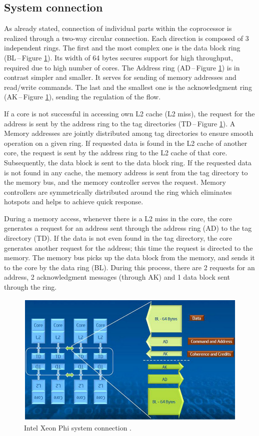 \subsection{System connection}
As already stated, connection of individual parts within the coprocessor is realized through a two-way circular connection. Each direction is composed of 3 independent rings. The first and the most complex one is the data block ring (BL\,--\,Figure \ref{fig:phi_connection}). Its width of 64 bytes secures support for high throughput, required due to high number of cores. The Address ring (AD\,--\,Figure \ref{fig:phi_connection}) is in contrast simpler and smaller. It serves for sending of memory addresses and read/write commands. The last and the smallest one is the acknowledgment ring (AK\,--\,Figure \ref{fig:phi_connection}), sending the regulation of the flow.

\par If a core is not successful in accessing own L2 cache (L2 miss), the request for the address is sent by the address ring to the tag directories (TD\,--\,Figure \ref{fig:phi_connection}). A Memory addresses are jointly distributed among tag directories to ensure smooth operation on a given ring. If requested data is found in the L2 cache of another core, the request is sent by the address ring to the L2 cache of that core. Subsequently, the data block is sent to the data block ring. If the requested data is not found in any cache, the memory address is sent from the tag directory to the memory bus, and the memory controller serves the request. Memory controllers are symmetrically distributed around the ring which eliminates hotspots and helps to achieve quick response.

\par During a memory access, whenever there is a L2 miss in the core, the core generates a request for an address sent through the address ring (AD) to the tag directory (TD). If the data is not even found in the tag directory, the core generates another request for the address; this time the request is directed to the memory. The memory bus picks up the data block from the memory, and sends it to the core by the data ring (BL). During this process, there are 2 requests for an address, 2 acknowledgment messages (through AK) and 1 data block sent through the ring.

\begin{figure}[htb]
    \centering
    \includegraphics[width=0.7\linewidth]{fig/phi_connection.png}
    \caption{Intel Xeon Phi system connection \cite{intel_phi_architecture}.}
    \label{fig:phi_connection}
\end{figure} 

